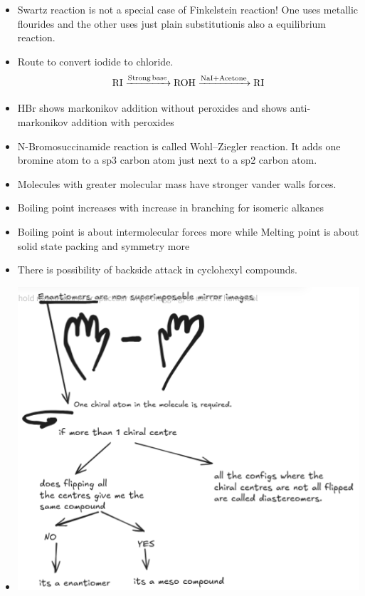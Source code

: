 \documentclass[12pt]{article}
\begin{document}
\usepackage{mhchem}
\usepackage{graphicx}
\begin{itemize}
\item 
Swartz reaction is not a special case of Finkelstein reaction! One uses metallic flourides and the other uses just plain substitution{is also a equilibrium reaction}.

\item 
Route to convert iodide to chloride.
\[
\ce{RI ->[Strong base] ROH ->[NaI + Acetone] RI}
\]

\item
HBr shows markonikov addition without peroxides and shows anti-markonikov addition with peroxides

\item
N-Bromosuccinamide reaction is called Wohl–Ziegler reaction. It adds one bromine atom to a sp3 carbon atom just next to a sp2 carbon atom. 

\item
Molecules with greater molecular mass have stronger vander walls forces.

\item
Boiling point increases with increase in branching for isomeric alkanes

\item 
Boiling point is about intermolecular forces more while Melting point is about solid state packing and symmetry more

\item
There is possibility of backside attack in cyclohexyl compounds.

\item
	\includegraphics{Fig1.png}


\end{itemize}
\end{document}
